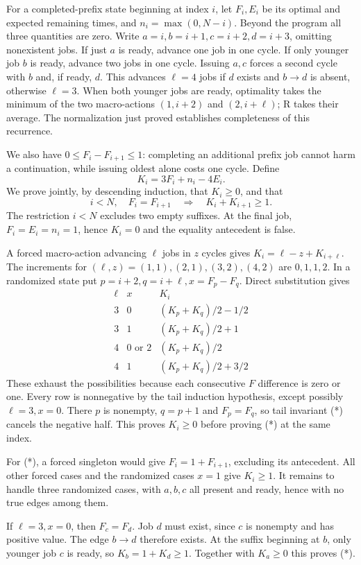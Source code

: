 \documentclass[11pt]{article}
\begin{document}
For a completed-prefix state beginning at index $i$, let $F_i,E_i$ be its
optimal and expected remaining times, and $n_i=\max(0,N-i)$. Beyond the
program all three quantities are zero. Write $a=i,b=i+1,c=i+2,d=i+3$,
omitting nonexistent jobs. If just $a$ is ready, advance one job in one
cycle. If only younger job $b$ is ready, advance two jobs in one cycle.
Issuing $a,c$ forces a second cycle with $b$ and, if ready, $d$. This
advances $\ell=4$ jobs if $d$ exists and $b\to d$ is absent, otherwise
$\ell=3$. When both younger jobs are ready, optimality takes the minimum
of the two macro-actions $(1,i+2)$ and $(2,i+\ell)$; R takes their average.
The normalization just proved establishes completeness of this recurrence.

We also have $0\le F_i-F_{i+1}\le1$: completing an additional prefix job
cannot harm a continuation, while issuing oldest alone costs one cycle.
Define
\[
 K_i=3F_i+n_i-4E_i.
\]
We prove jointly, by descending induction, that $K_i\ge0$, and that
\[
 i<N,\quad F_i=F_{i+1}\quad\Longrightarrow\quad K_i+K_{i+1}\ge1.
 \tag{*}
\]
The restriction $i<N$ excludes two empty suffixes. At the final job,
$F_i=E_i=n_i=1$, hence $K_i=0$ and the equality antecedent is false.

A forced macro-action advancing $\ell$ jobs in $z$ cycles gives
$K_i=\ell-z+K_{i+\ell}$. The increments for $(\ell,z)=(1,1),(2,1),
(3,2),(4,2)$ are $0,1,1,2$. In a randomized state put
$p=i+2,q=i+\ell,x=F_p-F_q$. Direct substitution gives
\[
\begin{array}{c|c|c}
\ell&x&K_i\\\hline
3&0&(K_p+K_q)/2-1/2\\
3&1&(K_p+K_q)/2+1\\
4&0\text{ or }2&(K_p+K_q)/2\\
4&1&(K_p+K_q)/2+3/2
\end{array}
\]
These exhaust the possibilities because each consecutive $F$ difference
is zero or one. Every row is nonnegative by the tail induction hypothesis,
except possibly $\ell=3,x=0$. There $p$ is nonempty, $q=p+1$ and
$F_p=F_q$, so tail invariant (*) cancels the negative half. This proves
$K_i\ge0$ before proving (*) at the same index.

For (*), a forced singleton would give $F_i=1+F_{i+1}$, excluding its
antecedent. All other forced cases and the randomized cases $x=1$ give
$K_i\ge1$. It remains to handle three randomized cases, with $a,b,c$
all present and ready, hence with no true edges among them.

If $\ell=3,x=0$, then $F_c=F_d$. Job $d$ must exist, since $c$ is nonempty
and has positive value. The edge $b\to d$ therefore exists. At the suffix
beginning at $b$, only younger job $c$ is ready, so
$K_b=1+K_d\ge1$. Together with $K_a\ge0$ this proves (*).
\end{document}
